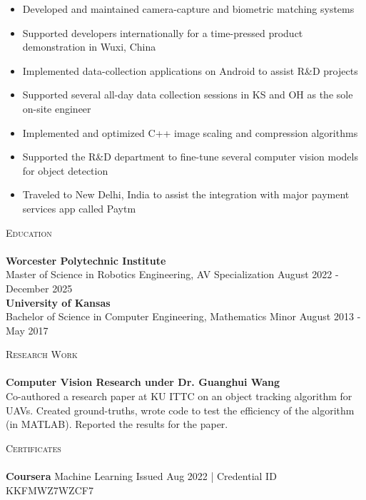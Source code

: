 \documentclass[a4paper]{article}
\newcommand{\lineunder} {
    \vspace*{-8pt} \\
    \hspace*{-18pt} \hrulefill \\
}
\newcommand{\header} [1] {
    {\hspace*{-18pt}\vspace*{6pt} \textsc{#1}}
    \vspace*{-6pt} \lineunder
}
\begin{document}
\vspace{-1mm}
\begin{itemize} \itemsep 1pt
	\item Developed and maintained camera-capture and biometric matching systems
	\item Supported developers internationally for a time-pressed product demonstration in Wuxi, China
	\item Implemented data-collection applications on Android to assist R\&D projects
	\item Supported several all-day data collection sessions in KS and OH as the sole on-site engineer
	\item Implemented and optimized C++ image scaling and compression algorithms
	\item Supported the R\&D department to fine-tune several computer vision models for object detection
	\item Traveled to New Delhi, India to assist the integration with major payment services app called Paytm
\end{itemize}

\header{Education}
\textbf{Worcester Polytechnic Institute}\\
Master of Science in Robotics Engineering, AV Specialization \hfill August 2022 - December 2025\\
\vspace{2mm}
\textbf{University of Kansas}\\
Bachelor of Science in Computer Engineering, Mathematics Minor \hfill August 2013 - May 2017\\
\vspace{2mm}

\header{Research Work}
{\textbf{Computer Vision Research under Dr. Guanghui Wang}}\\
Co-authored a research paper at KU ITTC on an object tracking algorithm for UAVs. Created ground-truths, wrote code to test the efficiency of the algorithm (in MATLAB). Reported the results for the paper.\\
\vspace*{2mm}

\header{Certificates}
{\textbf{Coursera}}
Machine Learning \hfill Issued Aug 2022 | \footnotesize{Credential ID KKFMWZ7WZCF7}

\ 
\end{document}
